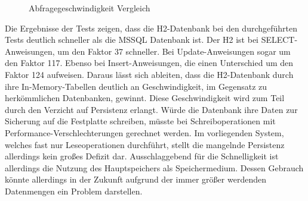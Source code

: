 \begin{figure}[htbp]
\centering
{}\hfill
{}\hfill
{}
\caption{Abfragegeschwindigkeit Vergleich}
\label{ergebniss_vergleich}
\end{figure}

Die Ergebnisse der Tests zeigen, dass die H2-Datenbank bei den durchgeführten Tests deutlich schneller als die MSSQL Datenbank ist. Der H2 ist bei SELECT-Anweisungen, um den Faktor 37 schneller. Bei Update-Anweisungen sogar um den Faktor 117. Ebenso bei Insert-Anweisungen, die einen Unterschied um den Faktor 124 aufweisen. Daraus lässt sich ableiten, dass die H2-Datenbank durch ihre In-Memory-Tabellen deutlich an Geschwindigkeit, im Gegensatz zu herkömmlichen Datenbanken, gewinnt. Diese Geschwindigkeit wird zum Teil durch den Verzicht auf Persistenz erlangt. Würde die Datenbank ihre Daten zur Sicherung auf die Festplatte schreiben, müsste bei Schreiboperationen mit Performance-Verschlechterungen gerechnet werden. Im vorliegenden System, welches fast nur Leseoperationen durchführt, stellt die mangelnde Persistenz allerdings kein großes Defizit dar. Ausschlaggebend für die Schnelligkeit ist allerdings die Nutzung des Hauptspeichers als Speichermedium. Dessen Gebrauch könnte allerdings in der Zukunft aufgrund der immer größer werdenden Datenmengen ein Problem darstellen.  

